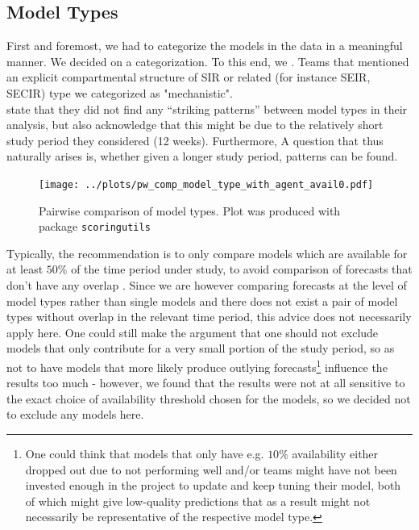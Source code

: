 \subsection{Model Types} \label{sub:model_types_analysis}
First and foremost, we had to categorize the models in the data in a meaningful manner. We decided on a categorization. To this end, we . Teams that mentioned an explicit compartmental structure of SIR or related (for instance SEIR, SECIR) type we categorized as "mechanistic".\\
\citep{bracher_evaluating_2021} state that they did not find any ``striking patterns'' between model types in their analysis, but also acknowledge that this might be due to the relatively short study period they considered (12 weeks). Furthermore, A question that thus naturally arises is, whether given a longer study period, patterns can be found.\\
\begin{figure}
\centering
\texttt{[image: ../plots/pw\_comp\_model\_type\_with\_agent\_avail0.pdf]}
\caption{Pairwise comparison of model types. Plot was produced with package \texttt{scoringutils}}
\label{fig:pw_comp_modeltypes}
\end{figure}
Typically, the recommendation is to only compare models which are available for at least $50\% $ of the time period under study, to avoid comparison of forecasts that don't have any overlap \citep{bosse_epiforecastsscoringutils_2022}. Since we are however comparing forecasts at the level of model types rather than single models and there does not exist a pair of model types without overlap in the relevant time period, this advice does not necessarily apply here. One could still make the argument that one should not exclude models that only contribute for a very small portion of the study period, so as not to have models that more likely produce outlying forecasts\footnote{One could think that models that only have e.g. $10\%$ availability either dropped out due to not performing well and/or teams might have not been invested enough in the project to update and keep tuning their model, both of which might give low-quality predictions that as a result might not necessarily be representative of the respective model type.} influence the results too much - however, we found that the results were not at all sensitive to the exact choice of availability threshold chosen for the models, so we decided not to exclude any models here.\\ 
